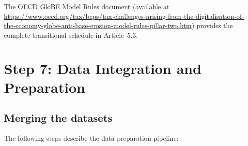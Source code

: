 \documentclass[12pt,a4paper]{article}
\begin{document}
The OECD GloBE Model Rules document (available at \url{https://www.oecd.org/tax/beps/tax-challenges-arising-from-the-digitalisation-of-the-economy-globe-anti-base-erosion-model-rules-pillar-two.htm}) provides the complete transitional schedule in Article~5.3.


\section{Step 7: Data Integration and Preparation}\label{sec:integration}

\subsection{Merging the datasets}

The following steps describe the data preparation pipeline:
\end{document}
